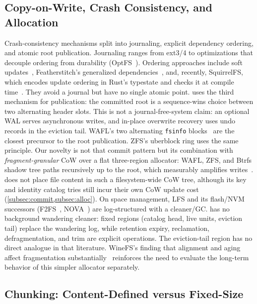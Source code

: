 \subsection{Copy-on-Write, Crash Consistency, and Allocation}
\label{subsec:rw-cow}

Crash-consistency mechanisms split into journaling, explicit dependency
ordering, and atomic root publication.  Journaling ranges from
ext3/4 to optimizations that decouple ordering from durability
(OptFS~\citep{Chidambaram2013OptFS}). Ordering approaches include soft
updates~\citep{Ganger2000SoftUpdates}, Featherstitch's generalized
dependencies~\citep{Frost2007Featherstitch}, and, recently, SquirrelFS, which
encodes update ordering in Rust's typestate and checks it at compile
time~\citep{LeBlanc2024SquirrelFS}. They avoid a journal but have no single atomic
point. \sfs{} uses the third mechanism for publication: the committed root is a
sequence-wins choice between two alternating header slots. This is not a
journal-free-system claim: an optional WAL serves asynchronous writes, and
in-place overwrite recovery uses undo records in the eviction tail. WAFL's two
alternating \texttt{fsinfo} blocks~\citep{Hitz1994WAFL} are the closest
precursor to the root publication. ZFS's uberblock ring uses the same principle.
Our novelty is not that commit pattern but its combination with
\emph{fragment-granular} CoW over a flat three-region allocator: WAFL, ZFS, and
Btrfs shadow tree paths recursively up to the root,
which measurably amplifies writes~\citep{Rodeh2013Btrfs}. \sfs{} does not place
file content in such a filesystem-wide CoW tree, although its key and identity
catalog tries still incur their own CoW update cost
(\cref{subsec:commit,subsec:alloc}). On space management, LFS and
its flash/NVM successors (F2FS~\citep{Lee2015F2FS}, NOVA~\citep{Xu2016NOVA}) are
log-structured with a cleaner/GC.  \sfs{} has no background wandering cleaner:
fixed regions (catalog head, live units, eviction tail) replace the wandering
log, while retention expiry, reclamation, defragmentation, and trim are explicit
operations.  The eviction-tail region has no direct analogue in that
literature. WineFS's finding that alignment and aging affect fragmentation
substantially~\citep{Kadekodi2021WineFS} reinforces the need to evaluate the
long-term behavior of this simpler allocator separately.

\subsection{Chunking: Content-Defined versus Fixed-Size}
\label{subsec:rw-chunking}

